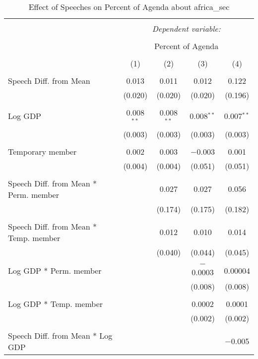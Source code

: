 
\begin{table}[!htbp] \centering 
  \caption{Effect of Speeches on Percent of Agenda about africa_sec} 
  \label{} 
\begin{tabular}{@{\extracolsep{5pt}}lcccc} 
\\[-1.8ex]\hline 
\hline \\[-1.8ex] 
 & \multicolumn{4}{c}{\textit{Dependent variable:}} \\ 
\cline{2-5} 
\\[-1.8ex] & \multicolumn{4}{c}{Percent of Agenda} \\ 
\\[-1.8ex] & (1) & (2) & (3) & (4)\\ 
\hline \\[-1.8ex] 
 Speech Diff. from Mean & 0.013 & 0.011 & 0.012 & 0.122 \\ 
  & (0.020) & (0.020) & (0.020) & (0.196) \\ 
  & & & & \\ 
 Log GDP & 0.008$^{**}$ & 0.008$^{**}$ & 0.008$^{**}$ & 0.007$^{**}$ \\ 
  & (0.003) & (0.003) & (0.003) & (0.003) \\ 
  & & & & \\ 
 Temporary member & 0.002 & 0.003 & $-$0.003 & 0.001 \\ 
  & (0.004) & (0.004) & (0.051) & (0.051) \\ 
  & & & & \\ 
 Speech Diff. from Mean * Perm. member &  & 0.027 & 0.027 & 0.056 \\ 
  &  & (0.174) & (0.175) & (0.182) \\ 
  & & & & \\ 
 Speech Diff. from Mean * Temp. member &  & 0.012 & 0.010 & 0.014 \\ 
  &  & (0.040) & (0.044) & (0.045) \\ 
  & & & & \\ 
 Log GDP * Perm. member &  &  & $-$0.0003 & 0.00004 \\ 
  &  &  & (0.008) & (0.008) \\ 
  & & & & \\ 
 Log GDP * Temp. member &  &  & 0.0002 & 0.0001 \\ 
  &  &  & (0.002) & (0.002) \\ 
  & & & & \\ 
 Speech Diff. from Mean * Log GDP &  &  &  & $-$0.005 \\ 

\end{tabular}
\end{table}
